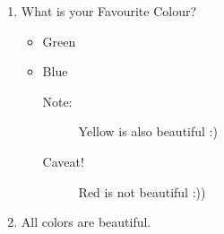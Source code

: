 \documentclass[14pt]{article}
\begin{document}
  
                \begin{enumerate}
                   \item What is your Favourite Colour?
                   \begin{itemize}
                       \item Green
                       \item Blue
                            \begin{description}
                                  \item[Note:] Yellow is also beautiful :)
                                  \item[Caveat!] Red is not beautiful :))
                            \end{description}
                   \end{itemize}
               \item All colors are beautiful.
            \end{enumerate}  
    
\end{document}
